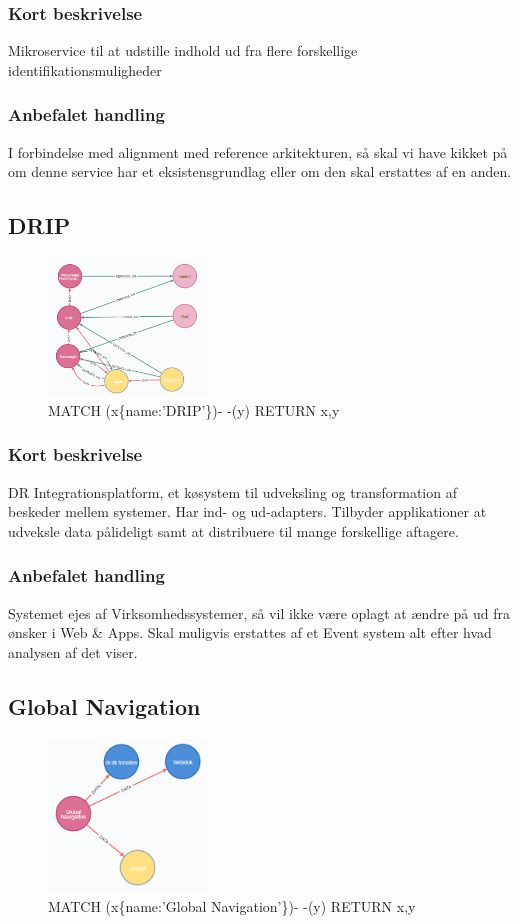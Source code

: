 \documentclass{article}
\begin{document}
\subsubsection*{Kort beskrivelse}
Mikroservice til at udstille indhold ud fra flere forskellige identifikationsmuligheder
\subsubsection*{Anbefalet handling}
I forbindelse med alignment med reference arkitekturen, så skal vi have kikket på om denne service har et eksistensgrundlag eller om den skal erstattes af en anden.


\subsection{DRIP}
\begin{figure}[h]
\includegraphics[width=120pt]{DRIP.PNG}
\caption{MATCH (x\{name:'DRIP'\})- -(y) RETURN x,y}
\end{figure}
\subsubsection*{Kort beskrivelse}
DR Integrationsplatform, et køsystem til udveksling og transformation af beskeder mellem systemer. Har ind- og ud-adapters.
Tilbyder applikationer at udveksle data pålideligt samt at distribuere til mange forskellige aftagere.
\subsubsection*{Anbefalet handling}
Systemet ejes af Virksomhedssystemer, så vil ikke være oplagt at ændre på ud fra ønsker i Web \& Apps. 
Skal muligvis erstattes af et Event system alt efter hvad analysen af det viser.


\subsection{Global Navigation}
\begin{figure}[h]
\includegraphics[width=120pt]{GlobalNavigation.PNG}
\caption{MATCH (x\{name:'Global Navigation'\})- -(y) RETURN x,y}
\end{figure}
\end{document}
